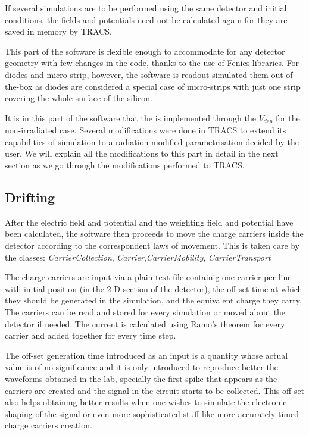 If several simulations are to be performed using the same detector and initial conditions, the fields and potentials need not be calculated again for they are saved in memory by TRACS. 

This part of the software is flexible enough to accommodate for any detector geometry with few changes in the code, thanks to the use of Fenics libraries. For diodes and micro-strip, however, the software is readout simulated them out-of-the-box as diodes are considered a special case of micro-strips with just one strip covering the whole surface of the silicon.

It is in this part of the software that the \neff is implemented through the $V_{dep}$ for the non-irradiated case. Several modifications were done in TRACS to extend its capabilities of simulation to a radiation-modified \neff parametrisation decided by the user. We will explain all the modifications to this part in detail in the next section as we go through the modifications performed to TRACS.


\subsection{Drifting}

After the electric field and potential and the weighting field and potential have been calculated, the software then proceeds to move the charge carriers inside the detector according to the correspondent laws of movement. This is taken care by the classes: \textit{CarrierCollection}, \textit{Carrier},\textit{CarrierMobility}, \textit{CarrierTransport}

The charge carriers are input via a plain text file containig one carrier per line with initial position (in the 2-D section of the detector), the off-set time at which they should be generated in the simulation, and the equivalent charge they carry. The carriers can be read and stored for every simulation or moved about the detector if needed. The current is calculated using Ramo's theorem for every carrier and added together for every time step.

The off-set generation time introduced as an input is a quantity whose actual value is of no significance and it is only introduced to reproduce better the waveforms obtained in the lab, specially the first spike that appears as the carriers are created and the signal in the circuit starts to be collected. This off-set also helps obtaining better results when one wishes to simulate the electronic shaping of the signal or even more sophisticated stuff like more accurately timed charge carriers creation.

